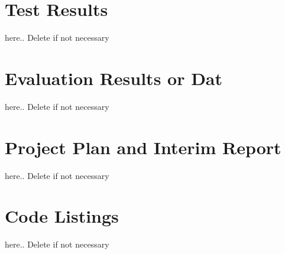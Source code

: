 \chapter{Test Results}
here.. Delete if not necessary

\chapter{Evaluation Results or Dat}
here.. Delete if not necessary

\chapter{Project Plan and Interim Report}
here.. Delete if not necessary

\chapter{Code Listings}
here.. Delete if not necessary
